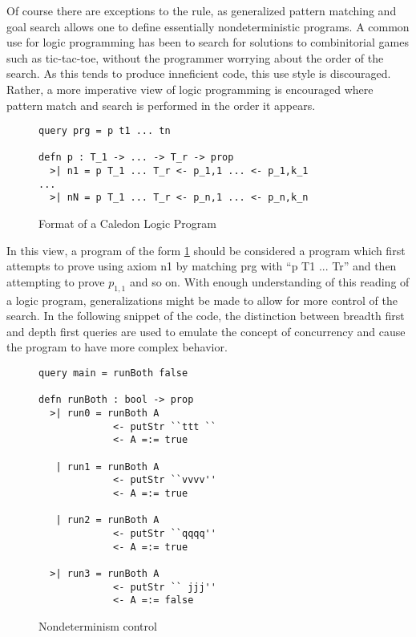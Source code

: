 Of course there are exceptions to the rule, as generalized pattern matching and 
goal search allows one to define essentially nondeterministic programs.  A common use for logic programming
has been to search for solutions to combinitorial games such as tic-tac-toe, without the programmer worrying about the order
of the search.  As this tends to produce inneficient code, this use style is discouraged.  Rather, a more imperative 
view of logic programming is encouraged where pattern match and search is performed in the order it appears.  

\begin{figure}[H]
\begin{lstlisting}
query prg = p t1 ... tn

defn p : T_1 -> ... -> T_r -> prop
  >| n1 = p T_1 ... T_r <- p_1,1 ... <- p_1,k_1
...
  >| nN = p T_1 ... T_r <- p_n,1 ... <- p_n,k_n

\end{lstlisting}
\caption{Format of a Caledon Logic Program}
\label{code:format}
\end{figure}

In this view, a program of the form \ref{code:format}
should be considered a program which first attempts to prove using axiom n1 by matching prg with ``p T1 ... Tr'' and then
attempting to prove $p_{1,1}$ and so on.    With enough understanding of this reading of a logic program, generalizations might be made
to allow for more control of the search.  In the following snippet of the code, the distinction between breadth first and depth first
queries are used to emulate the concept of concurrency and cause the program to have more complex behavior.

\begin{figure}[H]
\begin{lstlisting}
query main = runBoth false

defn runBoth : bool -> prop
  >| run0 = runBoth A 
             <- putStr ``ttt ``
             <- A =:= true

   | run1 = runBoth A
             <- putStr ``vvvv''
             <- A =:= true

   | run2 = runBoth A
             <- putStr ``qqqq''
             <- A =:= true

  >| run3 = runBoth A
             <- putStr `` jjj''
             <- A =:= false
\end{lstlisting}
\caption{Nondeterminism control}
\label{code:nondet}
\end{figure}

